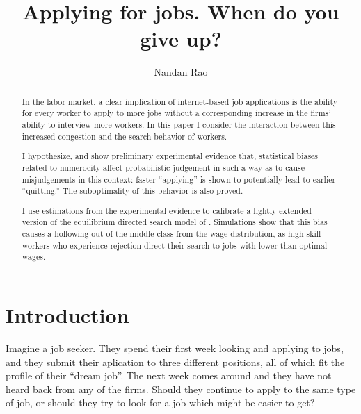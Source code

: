 \documentclass[a4paper,12pt]{article}
\begin{document}
\title{ Applying for jobs. When do you give up?  }

\author{Nandan Rao}

\maketitle

\begin{abstract}

In the labor market, a clear implication of internet-based job applications is the ability for every worker to apply to more jobs without a corresponding increase in the firms' ability to interview more workers. In this paper I consider the interaction between this increased congestion and the search behavior of workers.

I hypothesize, and show preliminary experimental evidence that, statistical biases related to numerocity affect probabilistic judgement in such a way as to cause misjudgements in this context: faster ``applying'' is shown to potentially lead to earlier ``quitting.'' The suboptimality of this behavior is also proved.

I use estimations from the experimental evidence to calibrate a lightly extended version of the equilibrium directed search model of \cite{gonzalez2010}. Simulations show that this bias causes a hollowing-out of the middle class from the wage distribution, as high-skill workers who experience rejection direct their search to jobs with lower-than-optimal wages.

\end{abstract}




\section{Introduction}

Imagine a job seeker. They spend their first week looking and applying to jobs, and they submit their aplication to three different positions, all of which fit the profile of their ``dream job''. The next week comes around and they have not heard back from any of the firms. Should they continue to apply to the same type of job, or should they try to look for a job which might be easier to get?
\end{document}
